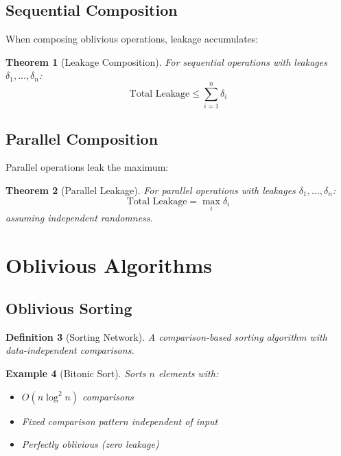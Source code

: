 \documentclass[11pt,final]{article}
\newtheorem{theorem}{Theorem}[section]
\newtheorem{definition}[theorem]{Definition}
\newtheorem{example}[theorem]{Example}
\begin{document}
\subsection{Sequential Composition}

When composing oblivious operations, leakage accumulates:

\begin{theorem}[Leakage Composition]
For sequential operations with leakages $\delta_1, \ldots, \delta_n$:
\begin{equation}
\text{Total Leakage} \leq \sum_{i=1}^n \delta_i
\end{equation}
\end{theorem}

\subsection{Parallel Composition}

Parallel operations leak the maximum:

\begin{theorem}[Parallel Leakage]
For parallel operations with leakages $\delta_1, \ldots, \delta_n$:
\begin{equation}
\text{Total Leakage} = \max_{i} \delta_i
\end{equation}
assuming independent randomness.
\end{theorem}

\section{Oblivious Algorithms}

\subsection{Oblivious Sorting}

\begin{definition}[Sorting Network]
A comparison-based sorting algorithm with data-independent comparisons.
\end{definition}

\begin{example}[Bitonic Sort]
Sorts $n$ elements with:
\begin{itemize}
    \item $O(n \log^2 n)$ comparisons
    \item Fixed comparison pattern independent of input
    \item Perfectly oblivious (zero leakage)
\end{itemize}
\end{example}
\end{document}
